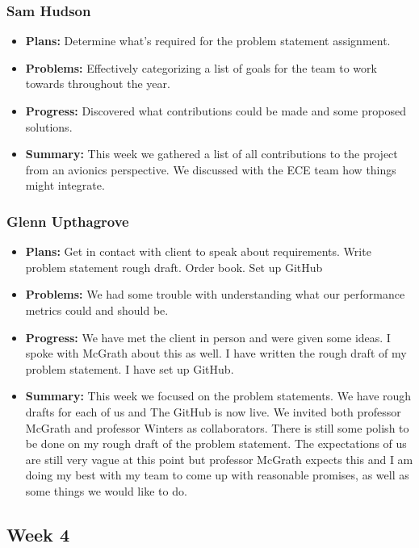 \documentclass[onecolumn, draftclsnofoot,10pt, compsoc]{IEEEtran}
\begin{document}
\subsubsection{Sam Hudson}
\begin {itemize}
\item \textbf{Plans: }Determine what’s required for the problem statement assignment.
\item \textbf{Problems: }Effectively categorizing a list of goals for the team to work towards throughout the year.
\item \textbf{Progress: }Discovered what contributions could be made and some proposed solutions.
\item \textbf{Summary: }This week we gathered a list of all contributions to the project from an avionics perspective. We discussed with the ECE team how things might integrate.
\end {itemize}
\subsubsection{Glenn Upthagrove}
\begin {itemize}
 \item \textbf{Plans: }Get in contact with client to speak about requirements. Write problem statement rough draft. Order book. Set up GitHub
 \item \textbf{Problems: }We had some trouble with understanding what our performance metrics could and should be. 
 \item \textbf{Progress: }We have met the client in person and were given some ideas. I spoke with McGrath about this as well. I have written the rough draft of my problem statement. I have set up GitHub. 
 \item \textbf{Summary: }This week we focused on the problem statements. We have rough drafts for each of us and The GitHub is now live. We invited both professor McGrath and professor Winters as collaborators. There is still some polish to be done on my rough draft of the problem statement. The expectations of us are still very vague at this point but professor McGrath expects this and I am doing my best with my team to come up with reasonable promises, as well as some things we would like to do. 
\end {itemize}
\subsection {Week 4}
\end{document}
